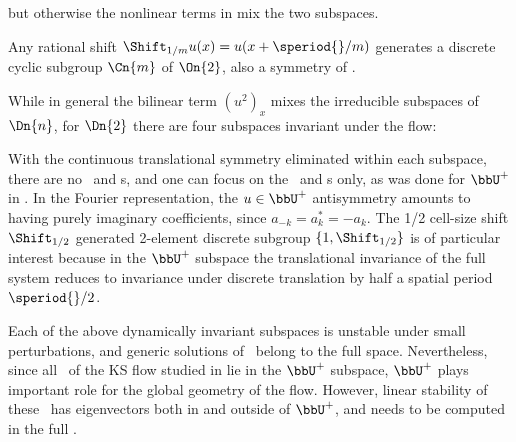 but otherwise the nonlinear terms in 
mix the two subspaces.

Any rational shift $ \Shift_{1/m}u(x)=u(x+\speriod{}/m)$ generates a discrete
cyclic subgroup $\Cn{m}$ of $\On{2}$, also a symmetry of \KSe.

While in general the bilinear term $(u^2)_x$  mixes the
irreducible subspaces of $\Dn{n}$, for $\Dn{2}$ there are
four subspaces invariant under the flow:

With the continuous
translational symmetry eliminated within each subspace, there are no
\reqva\ and \rpo s, and one
can focus on the \eqva\ and \po s only, as was done
for $\bbU^+$ in .
In the Fourier
representation, the
$u \in \bbU^+$
antisymmetry amounts to having purely imaginary
coefficients, since $a_{-k}= a^\ast_k = -a_k$.
The 1/2 cell-size shift $\Shift_{1/2}$
generated 2-element discrete subgroup
$\{1,\Shift_{1/2}\}$ is
of particular interest
because in the $\bbU^+$ subspace the translational invariance of the full system reduces to
invariance under discrete translation  by half a
spatial period $\speriod{}/2$.

Each of the above dynamically invariant subspaces is unstable
under small perturbations, and generic solutions of \KSe\ belong to
the full space.
Nevertheless, since  all \eqva\ of the KS flow studied in 
lie in the $\bbU^+$ subspace, $\bbU^+$  plays important role for the global
geometry of the flow.
However, linear stability of these \eqva\ has
eigenvectors both in and outside of $\bbU^+$, and needs to be
computed in the full \statesp.
